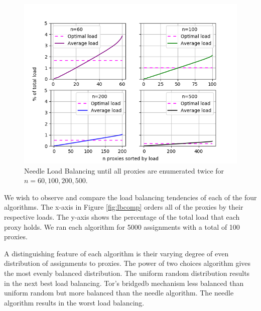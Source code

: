 \begin{figure}[h!]
\centering
     \includegraphics[width=1.0\textwidth]{fig/load_balance_needle_to_twice_enum_60_100_200_500.png}
    \caption{Needle Load Balancing until all proxies are enumerated twice for $n=60, 100, 200, 500$.}

    \label{fig:needlelb2}
\end{figure}

We wish to observe and compare the load balancing tendencies of each of the four algorithms. The x-axis in Figure \ref{fig:lbcomp} orders all of the proxies by their respective loads. The y-axis shows the percentage of the total load that each proxy holds. We ran each algorithm for 5000 assignments with a total of 100 proxies. 

A distinguishing feature of each algorithm is their varying degree of even distribution of assignments to proxies. The power of two choices algorithm gives the most evenly balanced distribution. The uniform random distribution results in the next best load balancing. Tor's bridgedb mechanism less balanced than uniform random but more balanced than the needle algorithm. The needle algorithm results in the worst load balancing.

